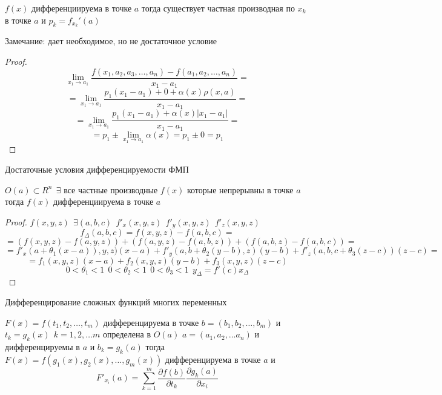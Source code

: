 \begin{theorem}
  $f(x)$ дифференциируема в точке $a$ тогда существует частная производная
  по $x_k$ в точке $a$ и $p_k = f_{x_k}'(a)$

  Замечание: дает необходимое, но не достаточное условие
\end{theorem}

\begin{proof}
  $$
  \lim_{x_1 \to a_1}
  \frac{f(x_1, a_2, a_3, \ldots, a_n) - f(a_1, a_2, \ldots, a_n)}{x_1 - a_1} =
  $$
  $$
  = \lim_{x_1 \to a_1}
  \frac{p_1(x_1 - a_1) + 0 + \alpha(x) \rho(x, a)}{x_1 - a_1} =
  $$
  $$
  = \lim_{x_1 \to a_1}
  \frac{p_1(x_1 - a_1) + \alpha(x) |x_1 - a_1|}{x_1 - a_1} =
  $$
  $$
  = p_1 \pm \lim_{x_1 \to a_1} \alpha(x) = p_1 \pm 0 = p_1
  $$
\end{proof}

\begin{title}[\Large]
  Достаточные условия дифференцируемости ФМП
\end{title}

\begin{theorem}
  $O(a) \subset R^n ~~ \exists$ все частные производные $f(x)$ которые
  непрерывны в точке $a$ тогда $f(x)$ дифференциируема в точке $a$
\end{theorem}

\begin{proof}
  $f(x,y,z) ~~ \exists (a,b,c) ~~ f'_x (x,y,z) ~~ f'_y (x,y,z) ~~ f'_z (x,y,z)$
  $$
  f_{\Delta}(a,b,c) = f(x,y,z) - f(a,b,c) =
  $$
  $$
  = (f(x,y,z) - f(a,y,z)) +
  (f(a,y,z) - f(a,b,z)) + (f(a,b,z) - f(a,b,c)) =
  $$
  $$
  = f'_x(a + \theta_1(x-a)), y, z)(x-a) + f'_y(a,b + \theta_2(y-b), z)(y-b) +
  f'_z(a,b,c + \theta_3(z-c))(z-c) =
  $$
  $$
  = f_1(x,y,z)(x-a) + f_2(x,y,z)(y-b) + f_3(x,y,z)(z-c)
  $$
  $$
  0 < \theta_1 < 1 ~~ 0 < \theta_2 < 1 ~~ 0 < \theta_3 < 1 ~~ y_{\Delta}
  = f'(c)x_{\Delta}
  $$
\end{proof}

\begin{title}[\Large]
  Дифференцирование сложных функций многих переменных
\end{title}

\begin{theorem}
  $F(x) = f(t_1, t_2, \ldots, t_m)$ дифференцируема в точке
  $b = (b_1, b_2, \ldots, b_m)$ и $t_k = g_k(x) ~~ k = 1,2, \ldots m$
  определена в $O(a)$ $a = (a_1, a_2, \ldots a_n)$ и дифференцируемы в $a$ и
  $b_k = g_k(a)$ тогда $F(x) = f(g_1(x), g_2(x), \ldots, g_m(x))$
  дифференцируема в точке $a$ и
  $$
  F'_{x_i}(a) = \sum_{k=1}^m \frac{\partial f(b)}{\partial t_k}
  \frac{\partial g_k(a)}{\partial x_i}
  $$
\end{theorem}

